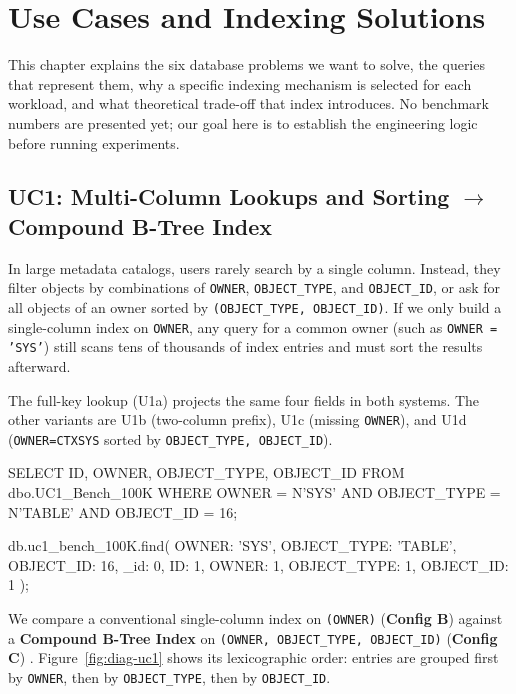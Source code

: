 \chapter{Use Cases and Indexing Solutions}
\label{ch:solutions}


This chapter explains the six database problems we want to solve, the queries that represent them, why a specific indexing mechanism is selected for each workload, and what theoretical trade-off that index introduces. No benchmark numbers are presented yet; our goal here is to establish the engineering logic before running experiments.

\section{UC1: Multi-Column Lookups and Sorting \texorpdfstring{$\rightarrow$}{->} Compound B-Tree Index}

In large metadata catalogs, users rarely search by a single column. Instead, they filter objects by combinations of \texttt{OWNER}, \texttt{OBJECT\_TYPE}, and \texttt{OBJECT\_ID}, or ask for all objects of an owner sorted by \texttt{(OBJECT\_TYPE, OBJECT\_ID)}. If we only build a single-column index on \texttt{OWNER}, any query for a common owner (such as \texttt{OWNER = 'SYS'}) still scans tens of thousands of index entries and must sort the results afterward.

The full-key lookup (U1a) projects the same four fields in both systems. The other variants are U1b (two-column prefix), U1c (missing \texttt{OWNER}), and U1d (\texttt{OWNER=CTXSYS} sorted by \texttt{OBJECT\_TYPE, OBJECT\_ID}).
\begin{SQLCode}
SELECT ID, OWNER, OBJECT_TYPE, OBJECT_ID
FROM dbo.UC1_Bench_100K
WHERE OWNER = N'SYS' AND OBJECT_TYPE = N'TABLE'
  AND OBJECT_ID = 16;
\end{SQLCode}
\begin{MongoCode}
db.uc1_bench_100K.find(
  {OWNER: 'SYS', OBJECT_TYPE: 'TABLE', OBJECT_ID: 16},
  {_id: 0, ID: 1, OWNER: 1, OBJECT_TYPE: 1, OBJECT_ID: 1}
);
\end{MongoCode}

We compare a conventional single-column index on \texttt{(OWNER)} (\textbf{Config B}) against a \textbf{Compound B-Tree Index} on \texttt{(OWNER, OBJECT\_TYPE, OBJECT\_ID)} (\textbf{Config C}) \cite{mssqlindex,mongocompound}. Figure~\ref{fig:diag-uc1} shows its lexicographic order: entries are grouped first by \texttt{OWNER}, then by \texttt{OBJECT\_TYPE}, then by \texttt{OBJECT\_ID}.

